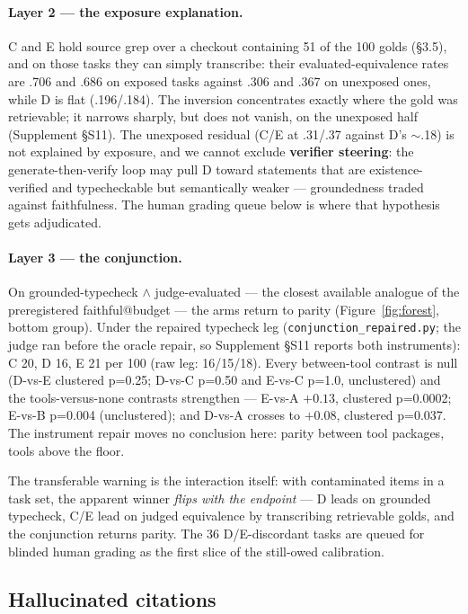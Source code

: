 \documentclass[10pt]{article}
\newcommand{\code}[1]{\texttt{#1}}
\newcommand{\Ssec}[1]{Supplement \S #1}
\begin{document}
\paragraph{Layer 2 --- the exposure explanation.} C and E hold source
grep over a checkout containing 51 of the 100 golds (\S 3.5), and on
those tasks they can simply transcribe: their evaluated-equivalence
rates are .706 and .686 on exposed tasks against .306 and .367 on
unexposed ones, while D is flat (.196/.184). The inversion concentrates
exactly where the gold was retrievable; it narrows sharply, but does not
vanish, on the unexposed half (\Ssec{S11}). The unexposed residual (C/E
at .31/.37 against D's $\sim$.18) is not explained by exposure, and we
cannot exclude \textbf{verifier steering}: the generate-then-verify loop
may pull D toward statements that are existence-verified and
typecheckable but semantically weaker --- groundedness traded against
faithfulness. The human grading queue below is where that hypothesis
gets adjudicated.

\paragraph{Layer 3 --- the conjunction.} On grounded-typecheck $\wedge$
judge-evaluated --- the closest available analogue of the preregistered
faithful@budget --- the arms return to parity
(Figure~\ref{fig:forest}, bottom group). Under the repaired
typecheck leg (\code{conjunction\_repaired.py}; the judge ran before the
oracle repair, so \Ssec{S11} reports both instruments): C 20, D 16,
E 21 per 100 (raw leg: 16/15/18). Every between-tool contrast is null
(D-vs-E clustered p=0.25; D-vs-C p=0.50 and E-vs-C p=1.0, unclustered)
and the tools-versus-none contrasts strengthen --- E-vs-A $+0.13$,
clustered p=0.0002; E-vs-B p=0.004 (unclustered); and D-vs-A crosses to
$+0.08$, clustered p=0.037. The instrument repair moves no conclusion
here: parity between tool packages, tools above the floor.

The transferable warning is the interaction itself: with contaminated
items in a task set, the apparent winner \emph{flips with the
endpoint} --- D leads on grounded typecheck, C/E lead on judged
equivalence by transcribing retrievable golds, and the conjunction
returns parity. The 36 D/E-discordant tasks are queued for blinded human
grading as the first slice of the still-owed calibration.

\subsection{Hallucinated citations}\label{sec:halluc}
\end{document}
